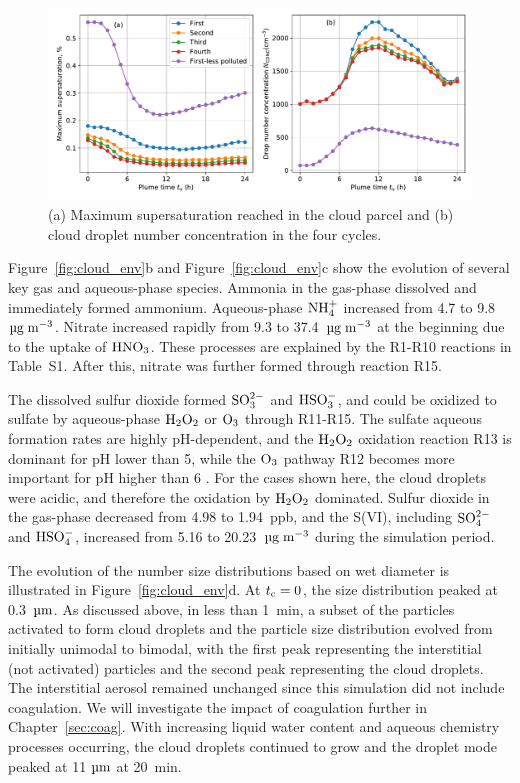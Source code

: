 \documentclass[edeposit,fullpage]{uiucthesis2009}
\begin{document}
\begin{figure}
    \centering
    \includegraphics[scale=0.5]{chap3_figs/fig_sup5.pdf}
    \caption{(a) Maximum supersaturation reached in the cloud parcel
      and (b) cloud droplet number concentration in the four cycles.}
    \label{fig:max_ss-cycle}
\end{figure}

Figure~\ref{fig:cloud_env}b and Figure~\ref{fig:cloud_env}c show the
evolution of several key gas and aqueous-phase species. Ammonia in the
gas-phase dissolved and immediately formed ammonium. Aqueous-phase
$\rm NH_4^+$ increased from 4.7 to 9.8~$\rm \mu g\;m^{-3}$. Nitrate
increased rapidly from 9.3 to 37.4~$\rm \mu g\;m^{-3}$ at the
beginning due to the uptake of $\rm HNO_3$. These processes are
explained by the R1-R10 reactions in Table~S1. After
this, nitrate was further formed through reaction R15.

The dissolved sulfur dioxide formed $\rm SO_3^{2-}$ and $\rm HSO_3^-$,
and could be oxidized to sulfate by aqueous-phase $\rm H_2O_2$ or $\rm
O_3$ through R11-R15. The sulfate aqueous formation rates are highly
pH-dependent, and the $\rm H_2O_2$ oxidation reaction R13 is dominant
for pH lower than 5, while the $\rm O_3$ pathway R12 becomes more
important for pH higher than 6 \citep{Seinfeld2016, Shao2019}. For the
cases shown here, the cloud droplets were acidic, and therefore the
oxidation by $\rm H_2O_2$ dominated. Sulfur dioxide in the gas-phase
decreased from 4.98 to 1.94~ppb, and the S(VI), including $\rm
SO_4^{2-}$ and $\rm HSO_4^-$, increased from 5.16 to 20.23~$\rm \mu
g\;m^{-3}$ during the simulation period.

The evolution of the number size distributions based on wet diameter
is illustrated in Figure~\ref{fig:cloud_env}d. At $t_{\rm c} =
0$, the size distribution peaked at 0.3~$\rm \mu m$.  As discussed
above, in less than 1~min, a subset of the particles activated to form
cloud droplets and the particle size distribution evolved from
initially unimodal to bimodal, with the first peak representing the
interstitial (not activated) particles and the second peak
representing the cloud droplets. The interstitial aerosol remained
unchanged since this simulation did not include coagulation. We will
investigate the impact of coagulation further in
Chapter~\ref{sec:coag}. With increasing liquid water content and
aqueous chemistry processes occurring, the cloud droplets continued to
grow and the droplet mode peaked at 11 $\rm \mu m$ at 20~min.
\end{document}
